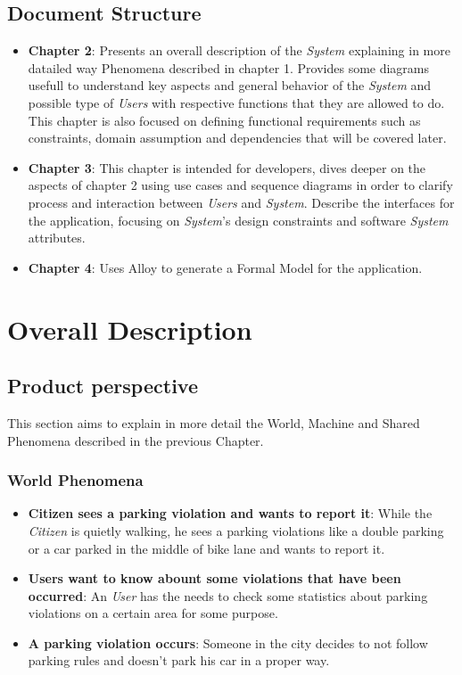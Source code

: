 \documentclass{article}
\begin{document}
\subsection{Document Structure}
\begin{itemize}
    \item \textbf{Chapter 2}: Presents an overall description of the \textit{System} explaining in more datailed 
    way Phenomena described in chapter 1. Provides some diagrams usefull to understand key aspects and 
    general behavior of the \textit{System} and possible type of \textit{Users} with respective functions that they are allowed to do. 
    This chapter is also focused on defining functional requirements such
    as constraints, domain assumption and dependencies that will be covered later.    
    \item \textbf{Chapter 3}: This chapter is intended for developers, dives deeper on the aspects of chapter 2 using 
    use cases and sequence diagrams in order to clarify process and interaction between \textit{Users} and \textit{System}. 
    Describe the interfaces for the application, focusing on \textit{System}'s design constraints and software \textit{System} attributes.  
    \item \textbf{Chapter 4}: Uses Alloy to generate a Formal Model for the application.
\end{itemize}

\clearpage

\section{Overall Description}

\subsection{Product perspective}
This section aims to explain in more detail the World, Machine and Shared Phenomena described in the 
previous Chapter. 

\subsubsection{World Phenomena}
\begin{itemize}
    \item \textbf{Citizen sees a parking violation and wants to report it}:
    While the \textit{Citizen} is quietly walking, he sees a parking violations like a double parking or a car
    parked in the middle of bike lane and wants to report it.
    \item \textbf{Users want to know abount some violations that have been occurred}:
    An \textit{User} has the needs to check some statistics about parking violations on a certain area
    for some purpose.
    \item \textbf{A parking violation occurs}:
    Someone in the city decides to not follow parking rules and doesn't park his car in a proper way.
\end{itemize}
\end{document}
